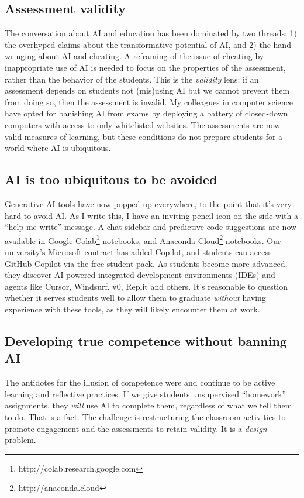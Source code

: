 \documentclass{tufte-handout}
\begin{document}
\subsection{Assessment validity}

The conversation about AI and education has been dominated by two threads: 1) the overhyped claims about the transformative potential of AI, and 2) the hand wringing about AI and cheating. A reframing of the issue of cheating by inappropriate use of AI is needed to focus on the properties of the assessment, rather than the behavior of the students.\cite{dawson2024validity} This is the \emph{validity} lens: if an assessment depends on students not (mis)using AI but we cannot prevent them from doing so, then the assessment is invalid. My colleagues in computer science have opted for banishing AI from exams by deploying a battery of closed-down computers with access to only whitelisted websites. The assessments are now valid measures of learning, but these conditions do not prepare students for a world where AI is ubiquitous.

\subsection{AI is too ubiquitous to be avoided}

Generative AI tools have now popped up everywhere, to the point that it’s very hard to avoid AI. As I write this, I have an inviting pencil icon on the side with a “help me write” message. A chat sidebar and predictive code suggestions are now available in Google Colab\footnote{http://colab.research.google.com} notebooks, and Anaconda Cloud\footnote{http://anaconda.cloud} notebooks. Our university’s Microsoft contract has added Copilot, and students can access GitHub Copilot via the free student pack. As students become more advanced, they discover AI-powered integrated development environments (IDEs) and agents like Cursor, Windsurf, v$0$, Replit and others. It’s reasonable to question whether it serves students well to allow them to graduate \emph{without} having experience with these tools, as they will likely encounter them at work.

\subsection{Developing true competence without banning AI}

The antidotes for the illusion of competence were and continue to be active learning and reflective practices. If we give students unsupervised “homework” assignments, they \emph{will} use AI to complete them, regardless of what we tell them to do. That is a fact. The challenge is restructuring the classroom activities to promote engagement and the assessments to retain validity. It is a \emph{design} problem.
\end{document}
